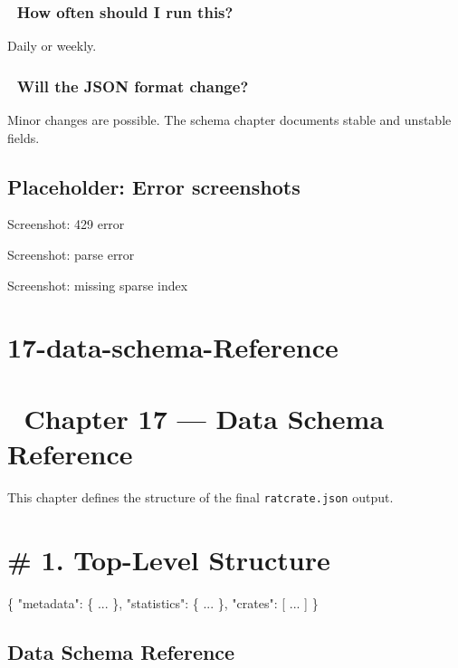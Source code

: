 \documentclass[
  letterpaper,
  DIV=11,
  numbers=noendperiod]{scrreprt}
\newenvironment{Shaded}{\begin{snugshade}}{\end{snugshade}}
\newcommand{\NormalTok}[1]{\textcolor[rgb]{0.00,0.23,0.31}{#1}}
\begin{document}
\subsection{💬 How often should I run
this?}\label{how-often-should-i-run-this}

Daily or weekly.

\subsection{💬 Will the JSON format
change?}\label{will-the-json-format-change}

Minor changes are possible. The schema chapter documents stable and
unstable fields.

\section{Placeholder: Error
screenshots}\label{placeholder-error-screenshots}

Screenshot: 429 error

Screenshot: parse error

Screenshot: missing sparse index

\chapter{17-data-schema-Reference}\label{data-schema-reference}

\chapter{📘 Chapter 17 --- Data Schema
Reference}\label{chapter-17-data-schema-reference}

This chapter defines the structure of the final \texttt{ratcrate.json}
output.

\chapter{\# 1. Top-Level Structure}\label{top-level-structure}

\begin{Shaded}
\begin{Highlighting}[]
\NormalTok{\{}
\NormalTok{  "metadata": \{ ... \},}
\NormalTok{  "statistics": \{ ... \},}
\NormalTok{  "crates": [ ... ]}
\NormalTok{\}}
\end{Highlighting}
\end{Shaded}

\section{Data Schema Reference}\label{data-schema-reference-1}
\end{document}
